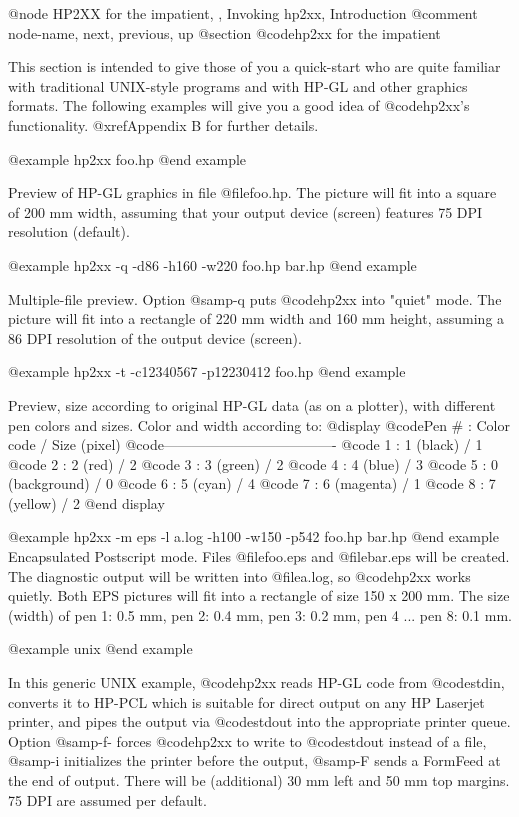 @node HP2XX for the impatient, , Invoking hp2xx, Introduction
@comment  node-name,  next,  previous,  up
@section @code{hp2xx} for the impatient

This section is intended to give those of you a quick-start who are
quite familiar with traditional UNIX-style programs and with HP-GL and
other graphics formats.
The following examples will give you a good idea of @code{hp2xx}'s
functionality. @xref{Appendix B} for further details.


@example
hp2xx foo.hp
@end example

Preview of HP-GL graphics in file @file{foo.hp}. The picture will
fit into a square of 200 mm width, assuming that your output device
(screen) features 75 DPI resolution (default).

@example
hp2xx -q -d86 -h160 -w220  foo.hp bar.hp
@end example

Multiple-file preview. Option @samp{-q} puts @code{hp2xx} into "quiet" mode.
The picture will fit into a rectangle of 220 mm width and 160 mm height,
assuming a 86 DPI resolution of the output device (screen).

@example
hp2xx -t -c12340567 -p12230412 foo.hp
@end example

Preview, size according to original HP-GL data (as on a plotter),
with different pen colors and sizes. Color and width according to:
@display
  @code{Pen # : Color code     / Size (pixel)}
  @code{-------------------------------------}
  @code{  1   : 1 (black)      /    1}
  @code{  2   : 2 (red)        /    2}
  @code{  3   : 3 (green)      /    2}
  @code{  4   : 4 (blue)       /    3}
  @code{  5   : 0 (background) /    0}
  @code{  6   : 5 (cyan)       /    4}
  @code{  7   : 6 (magenta)    /    1}
  @code{  8   : 7 (yellow)     /    2}
@end display

@example
hp2xx -m eps -l a.log -h100 -w150 -p542  foo.hp bar.hp
@end example
Encapsulated Postscript mode. Files @file{foo.eps} and @file{bar.eps}
will be created. The diagnostic output will be written into @file{a.log},
so @code{hp2xx} works quietly. Both EPS pictures will fit into a
rectangle of size 150 x 200 mm. The size (width) of
pen 1: 0.5 mm, pen 2: 0.4 mm, pen 3: 0.2 mm, pen 4 ... pen 8: 0.1 mm.

@example
unix%
@end example

In this generic UNIX example, @code{hp2xx} reads HP-GL code from @code{stdin},
converts it to HP-PCL which is suitable for direct output on any HP Laserjet
printer, and pipes the output via @code{stdout} into the appropriate printer queue.
Option @samp{-f-} forces @code{hp2xx} to write to @code{stdout} instead of
a file, @samp{-i} initializes the printer before the output,
@samp{-F} sends a FormFeed at the end of output. There will be (additional)
30 mm left and 50 mm top margins. 75 DPI are assumed per default.

